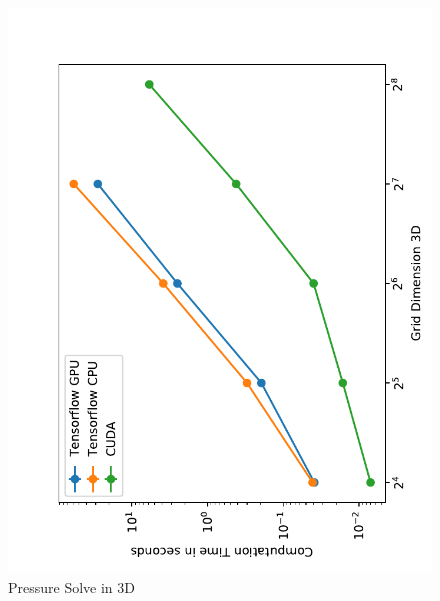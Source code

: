 \begin{figure}[t]
    \centering
	\includegraphics[scale=1.15]{figures/Benchmark3d}

	\caption{Pressure Solve in 3D}
\end{figure}